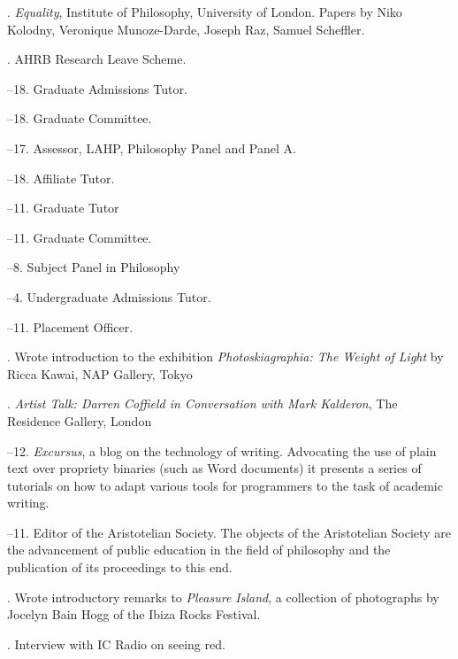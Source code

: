\documentclass[11pt]{article}
\begin{document}
. \emph{Equality}, Institute of Philosophy, University of London. Papers by Niko Kolodny, Veronique Munoze-Darde, Joseph Raz, Samuel Scheffler.

\bigskip

\medskip
  
. AHRB Research Leave Scheme.

\bigskip 

\medskip

--18. Graduate Admissions Tutor.

--18. Graduate Committee.

--17. Assessor, LAHP, Philosophy Panel and Panel A.

--18. Affiliate Tutor.

--11. Graduate Tutor

--11. Graduate Committee.

--8. Subject Panel in Philosophy

--4. Undergraduate Admissions Tutor.

--11. Placement Officer.

\bigskip

\medskip

. Wrote introduction to the exhibition \emph{Photoskiagraphia: The Weight of Light} by Ricca Kawai, NAP Gallery, Tokyo

. \emph{Artist Talk: Darren Coffield in Conversation with Mark Kalderon}, The Residence Gallery, London

--12. \emph{Excursus}, a blog on the technology of writing. Advocating the use of plain text over propriety binaries (such as Word documents) it presents a series of tutorials on how to adapt various tools for programmers to the task of academic writing.

--11. Editor of the Aristotelian Society. The objects of the Aristotelian Society are the advancement of public education in the field of philosophy and the publication of its proceedings to this end. 

. Wrote introductory remarks to \emph{Pleasure Island}, a collection of photographs by Jocelyn Bain Hogg of the Ibiza Rocks Festival.

. Interview with IC Radio on seeing red.
\end{document}

